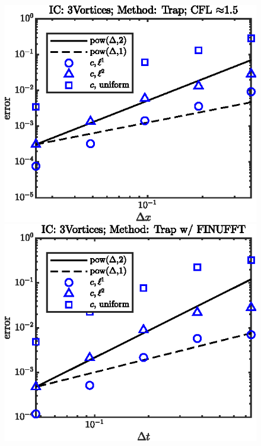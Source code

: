 \documentclass[11pt,letterpaper]{article}
\begin{document}
\begin{figure}[H]
    \includegraphics{figs/nonlin_conv_order_3Vortices_Trap}
    \includegraphics{figs/nonlin_conv_order_3Vortices_finu_Trap}
    \caption{}\label{fig:nonlin_conv_order_Taylor_Trap}
\end{figure}
\end{document}
